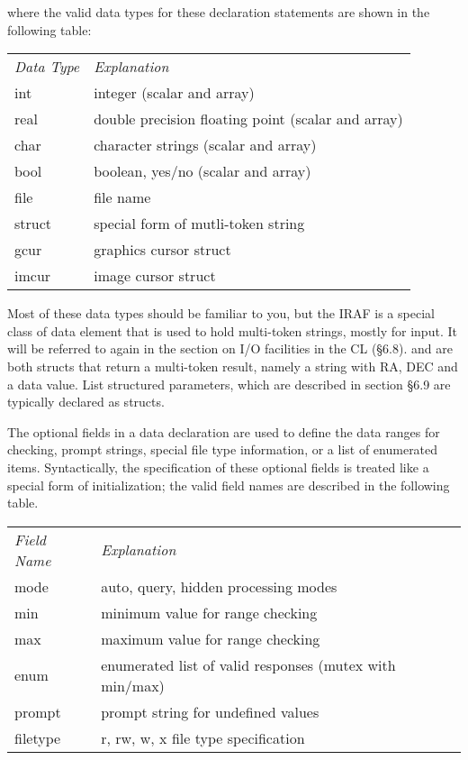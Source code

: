 \noindent
where the valid data types for these declaration statements are shown in
the following table:

\begin{tabular}{ll}
{\it Data Type}  &   {\it Explanation} \\
int &		integer (scalar and array) \\
real &		double precision floating point (scalar and array) \\
char &		character strings (scalar and array) \\
bool &		boolean, yes/no (scalar and array) \\
file &		file name \\
struct &	special form of mutli-token string \\
gcur &		graphics cursor struct \\
imcur &		image cursor struct 	
\end{tabular}

Most of these data types should be familiar to you, but the IRAF
 is a special class of data element that is used to
hold multi-token strings, mostly for input.  It will be referred to again
in the section on I/O facilities in the CL (\S 6.8).  
and  are both structs that return a multi-token result,
namely a string with RA, DEC and a data value.  List structured parameters,
which are described in section \S 6.9 are typically declared as
structs.

The optional fields in a data declaration are used to define the data
ranges for checking, prompt strings, special file type information,
or a list of enumerated items.  
Syntactically, the specification of these optional fields is treated 
like a special form of initialization; the valid field names are 
described in the following table.

\begin{tabular}{ll}
{\it Field Name}  &   {\it Explanation} \\
mode &		auto, query, hidden processing modes \\
min &		minimum value for range checking \\
max &		maximum value for range checking \\
enum &		enumerated list of valid responses (mutex with min/max) \\
prompt &	prompt string for undefined values \\
filetype &	r, rw, w, x file type specification
\end{tabular}


